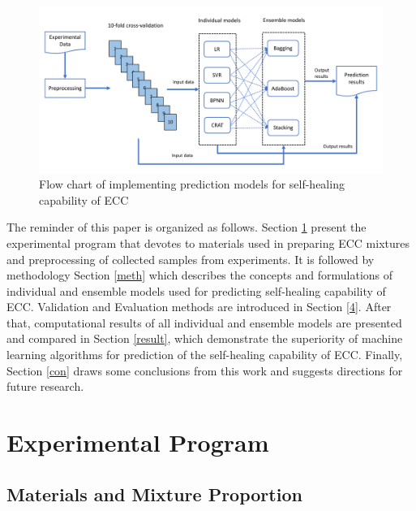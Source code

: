 \documentclass[11pt]{article}
\begin{document}
	\begin{figure}	
		\begin{center}
			\includegraphics[width=\textwidth]{structure.pdf}
		\end{center}
		\caption{Flow chart of implementing prediction models for self-healing capability of ECC}
		\label{fig:structure}
	\end{figure}
	
	
	The reminder of this paper is organized as follows. Section \ref{lab} present the experimental program that devotes to materials used in preparing ECC mixtures and preprocessing of collected samples from experiments. It is followed by methodology Section \ref{meth} which describes the concepts and formulations of individual and ensemble models used for predicting self-healing capability of ECC. Validation and Evaluation methods are introduced in Section \ref{4}. After that, computational results of all individual and ensemble models are presented and compared in Section \ref{result}, which demonstrate the superiority of machine learning algorithms for prediction of the self-healing capability of ECC. Finally, Section \ref{con} draws some conclusions from this work and suggests directions for future research.
	
	
	\section{Experimental Program}
	\label{lab}
	
	\subsection{Materials and Mixture Proportion}
	

	
	
\end{document}
